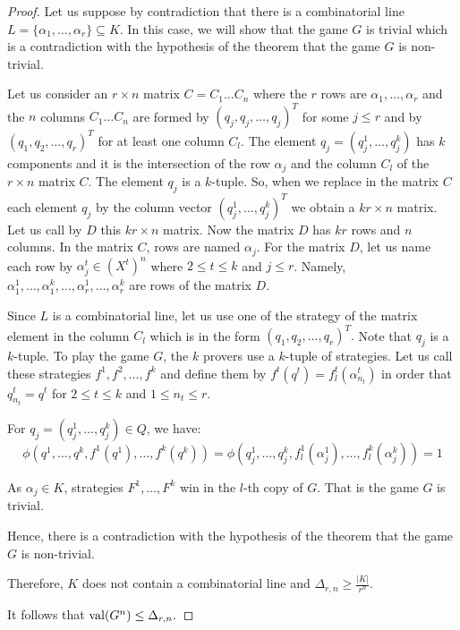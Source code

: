 \begin{proof}
Let us suppose by contradiction that there is a combinatorial line $L=\{\alpha_1, \ldots, \alpha_r \} \subseteq K.$  In this case,  we will show that  the game  $G$ is  trivial which is a contradiction with the hypothesis of the theorem that the game  $G$ is  non-trivial.

Let us consider an $r \times n$ matrix $C=C_1\ldots C_n$ where the $r$ rows are $\alpha_1, \ldots, \alpha_r$ and the $n$ columns $C_1\ldots C_n$  are formed by $(q_j,q_j,\ldots,q_j)^T$ for some $j\leq r$ and by $(q_1,q_2,\ldots,q_r)^T$ for at least one column $C_l.$ 
The element $q_j=(q_j^1,\ldots, q_j^k)$ has $k$ components and it is the intersection of the row $\alpha_j$ and the column $C_l$ of the $r \times n$  matrix $C.$ The element $q_j$ is a $k$-tuple. So, when we replace in the matrix $C$ each  element $q_j$  by the column vector $(q_j^1,\ldots, q_j^k)^T$ we obtain a $kr \times n$ matrix. Let us call by $D$ this $kr \times n$ matrix. Now the matrix $D$ has $kr$ rows and $n$ columns. In the matrix $C$, rows are named  $\alpha_j$. For the matrix $D$, let us name each row by $\alpha_j^t \in  (X^t)^n$ where $2\leq t \leq k$ and $ j \leq r$. Namely,  $\alpha_1^1, \ldots, \alpha_1^k, \ldots, \alpha_r^1, \ldots, \alpha_r^k$ are rows of the matrix $D.$

Since $L$ is a combinatorial line, let us use one of the strategy of the matrix element in the column $C_l$ which is in the form $(q_1,q_2,\ldots,q_r)^T.$  Note that $q_j$ is a $k$-tuple. To play the game $G$, the $k$ provers use a $k$-tuple of strategies. Let us call these strategies $f^1,f^2, \ldots, f^k$ and define them by $f^t(q^t)=f_l^t(\alpha_{n_t}^t)$ in order that  $q_{n_t}^t=q^t$ for $2\leq t \leq k$ and  $1\leq n_t \leq r.$ 

For  $q_j= (q_j^1,\ldots, q_j^k) \in Q$, we have:
$$\phi (q^1,\ldots, q^k, f^1(q^1), \ldots, f^k(q^k))= \phi (q_j^1,\ldots, q_j^k, f_l^1(\alpha_j^1), \ldots, f_l^k(\alpha_j^k))=1$$

As $\alpha_j \in K$,
strategies $F^1, \ldots, F^k$ win in  the $l$-th copy of $G$. That is the game $G$ is  trivial. 

Hence, there is a contradiction with the hypothesis of the theorem that the game  $G$ is  non-trivial.

Therefore, $K$ does not contain a combinatorial line and $\Delta_{r,n} \geq  \frac{|K|}{r^n}$.

It follows that $\mathrm{val} (G^n) \leq \Delta_{r,n}.$
\end{proof}

